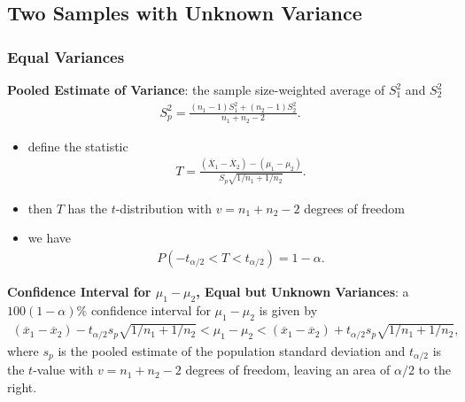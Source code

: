 \documentclass[10pt]{article}
\begin{document}
\subsection{Two Samples with Unknown Variance}
\subsubsection{Equal Variances}
\begin{definition}
    \textbf{Pooled Estimate of Variance}: the sample size-weighted average of $S_1^2$ and $S_2^2$ 
    \begin{gather*}
        S_p^2 = \frac{(n_1-1)S_1^2 + (n_2-1)S_2^2}{n_1 + n_2 - 2}
    .\end{gather*}
\end{definition}
\begin{itemize}
    \item define the statistic 
        \begin{gather*}
            T = \frac{(\overline{X}_1 - \overline{X}_2) - (\mu_1 - \mu_2)}{S_p \sqrt{1 / n_1 + 1 / n_2}}
        .\end{gather*}
    \item then $T$ has the $t$-distribution with $v = n_1 + n_2 - 2$ degrees of freedom
    \item we have 
        \begin{gather*}
            P(-t_{\alpha/2} < T < t_{\alpha / 2}) = 1- \alpha
        .\end{gather*}
\end{itemize}
\begin{theorem}
    \textbf{Confidence Interval for $\mu_1 - \mu_2$, Equal but Unknown Variances}: a $100(1-\alpha)\%$ confidence interval for $\mu_1-\mu_2$ is given by 
    \begin{gather*}
        (\overline{x}_1 - \overline{x}_2) - t_{\alpha / 2} s_p \sqrt{1 / n_1 + 1 / n_2} < \mu_1 - \mu_2 < (\overline{x}_1 - \overline{x}_2) + t_{\alpha / 2} s_p \sqrt{1 / n_1 + 1 / n_2}
    ,\end{gather*}
    where $s_p$ is the pooled estimate of the population standard deviation and $t_{\alpha / 2}$ is the $t$-value with $v=n_1 + n_2 -2$ degrees of freedom, leaving an area of $\alpha / 2$ to the right.
\end{theorem}
\end{document}
